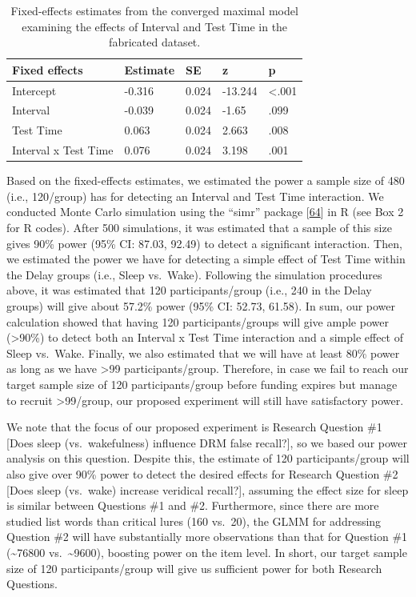 \documentclass[
]{article}
\begin{document}
\begin{table}[H]

\caption{\label{tab:tableD1}Fixed-effects estimates from the converged maximal model examining the effects of Interval and Test Time in the fabricated dataset.}
\centering
\begin{tabular}[t]{lllll}
\toprule
\textbf{Fixed effects} & \textbf{Estimate} & \textbf{SE} & \textbf{z} & \textbf{p}\\
\midrule
Intercept & -0.316 & 0.024 & -13.244 & <.001\\
Interval & -0.039 & 0.024 & -1.65 & .099\\
Test Time & 0.063 & 0.024 & 2.663 & .008\\
Interval x Test Time & 0.076 & 0.024 & 3.198 & .001\\
\bottomrule
\end{tabular}
\end{table}

Based on the fixed-effects estimates, we estimated the power a sample size of 480 (i.e., 120/group) has for detecting an Interval and Test Time interaction. We conducted Monte Carlo simulation using the ``simr'' package {[}\protect\hyperlink{ref-green2016a}{64}{]} in R (see Box 2 for R codes). After 500 simulations, it was estimated that a sample of this size gives 90\% power (95\% CI: 87.03, 92.49) to detect a significant interaction. Then, we estimated the power we have for detecting a simple effect of Test Time within the Delay groups (i.e., Sleep vs.~Wake). Following the simulation procedures above, it was estimated that 120 participants/group (i.e., 240 in the Delay groups) will give about 57.2\% power (95\% CI: 52.73, 61.58). In sum, our power calculation showed that having 120 participants/groups will give ample power (\textgreater90\%) to detect both an Interval x Test Time interaction and a simple effect of Sleep vs.~Wake. Finally, we also estimated that we will have at least 80\% power as long as we have \textgreater99 participants/group. Therefore, in case we fail to reach our target sample size of 120 participants/group before funding expires but manage to recruit \textgreater99/group, our proposed experiment will still have satisfactory power.

We note that the focus of our proposed experiment is Research Question \#1 {[}Does sleep (vs.~wakefulness) influence DRM false recall?{]}, so we based our power analysis on this question. Despite this, the estimate of 120 participants/group will also give over 90\% power to detect the desired effects for Research Question \#2 {[}Does sleep (vs.~wake) increase veridical recall?{]}, assuming the effect size for sleep is similar between Questions \#1 and \#2. Furthermore, since there are more studied list words than critical lures (160 vs.~20), the GLMM for addressing Question \#2 will have substantially more observations than that for Question \#1 (\textasciitilde76800 vs.~\textasciitilde9600), boosting power on the item level. In short, our target sample size of 120 participants/group will give us sufficient power for both Research Questions.
\end{document}

